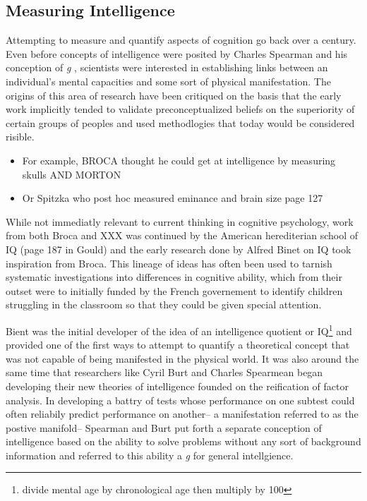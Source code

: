 \documentclass[]{book}
\providecommand{\tightlist}{%
  \setlength{\itemsep}{0pt}\setlength{\parskip}{0pt}}
\let\rmarkdownfootnote\footnote%
\def\footnote{\protect\rmarkdownfootnote}
\theoremstyle{definition}
\theoremstyle{definition}
\theoremstyle{definition}
\theoremstyle{remark}
\begin{document}
\hypertarget{measuring-intelligence}{%
\subsection{Measuring Intelligence}\label{measuring-intelligence}}

Attempting to measure and quantify aspects of cognition go back over a
century. Even before concepts of intelligence were posited by Charles
Spearman and his conception of \emph{g}
\citep{spearmanGeneralIntelligenceObjectively1904}, scientists were
interested in establishing links between an individual's mental
capacities and some sort of physical manifestation. The origins of this
area of research have been critiqued on the basis that the early work
implicitly tended to validate preconceptualized beliefs on the
superiority of certain groups of peoples and used methodlogies that
today would be considered risible.

\begin{itemize}
\tightlist
\item
  For example, BROCA thought he could get at intelligence by measuring
  skulls AND MORTON
\item
  Or Spitzka who post hoc measured eminance and brain size page 127
\end{itemize}

While not immediatly relevant to current thinking in cognitive
psychology, work from both Broca and XXX was continued by the American
herediterian school of IQ (page 187 in Gould) and the early research
done by Alfred Binet on IQ took inspiration from Broca. This lineage of
ideas has often been used to tarnish systematic investigations into
differences in cognitive ability, which from their outset were to
initially funded by the French governement to identify children
struggling in the classroom so that they could be given special
attention.

Bient was the initial developer of the idea of an intelligence quotient
or IQ\footnote{divide mental age by chronological age then multiply by
  100} and provided one of the first ways to attempt to quantify a
theoretical concept that was not capable of being manifested in the
physical world. It was also around the same time that researchers like
Cyril Burt and Charles Spearmean began developing their new theories of
intelligence founded on the reification of factor analysis. In
developing a battry of tests whose performance on one subtest could
often reliabily predict performance on another-- a manifestation
referred to as the postive manifold-- Spearman and Burt put forth a
separate conception of intelligence based on the ability to solve
problems without any sort of background information and referred to this
ability a \emph{g} for general intellgience.
\end{document}

